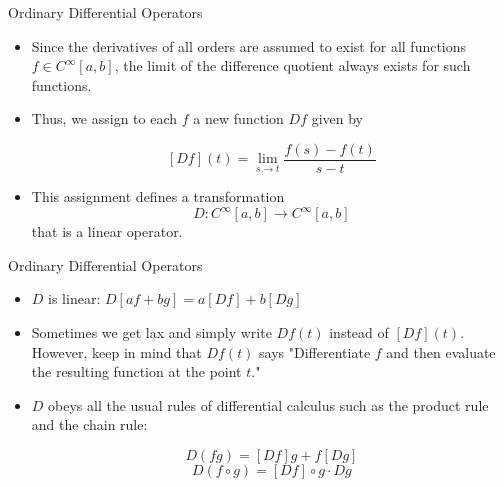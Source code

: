 
\begin{frame}
Ordinary Differential Operators
 
\begin{itemize}
 
\item Since the derivatives of all orders are assumed to exist
 for all functions $f\in C^\infty[a,b]$, the 
limit of the
 difference quotient always exists for such functions.
 
\item Thus, we assign to each $f$ a new function $Df$ given by

\begin{equation}\label{deriv}
  [Df](t) = \lim_{s\rightarrow t}\frac{f(s)-f(t)}{s-t}
\end{equation}
 
\item This assignment defines a transformation
 \[D:C^\infty[a,b]\rightarrow C^\infty[a,b]\]
  that is a linear operator.

\end{itemize}

\end{frame}


\begin{frame}
Ordinary Differential Operators
 
\begin{itemize}
    
\item $D$ is linear: $D[af+bg]=a[Df] + b[Dg]$
    
\item Sometimes we get lax and simply write $Df(t)$ instead of $[Df](t)$.  However, keep in mind that $Df(t)$ 
says "Differentiate $f$ and then evaluate the resulting function at the point $t$."
    
\item $D$ obeys all the usual rules of differential calculus such as the product rule and the chain rule:

\[D(fg)=[Df]g+f[Dg]\]
\[D(f\circ g) = [Df]\circ g \cdot Dg\]
 
\end{itemize}

\end{frame}


